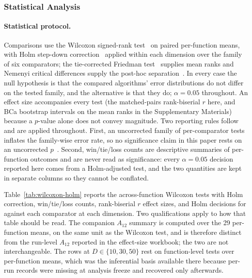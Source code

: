 \subsubsection{Statistical Analysis}\label{sec:exp:stats}

\paragraph{Statistical protocol.}
Comparisons use the Wilcoxon signed-rank test~\cite{wilcoxon1945individual} on
paired per-function means, with Holm step-down
correction~\cite{holm1979simple} applied within each dimension over the family
of six comparators; the tie-corrected Friedman test~\cite{friedman1937use}
supplies mean ranks and Nemenyi critical differences supply the post-hoc
separation~\cite{demsar2006statistical}. In every case the null hypothesis is
that the compared algorithms' error distributions do not differ on the tested
family, and the alternative is that they do; $\alpha = 0.05$ throughout.
An effect size accompanies every test
(the matched-pairs rank-biserial $r$ here, and BCa bootstrap intervals on the
mean ranks in the Supplementary Materials) because a $p$-value alone does not
convey magnitude. Two reporting rules follow and are applied throughout. First,
an uncorrected family of per-comparator tests inflates the family-wise error
rate, so no significance claim in this paper rests on an uncorrected
$p$~\cite{holm1979simple,demsar2006statistical}. Second, win/tie/loss counts are
descriptive summaries of per-function outcomes and are never read as
significance: every $\alpha = 0.05$ decision reported here comes from a
Holm-adjusted test, and the two quantities are kept in separate columns so they
cannot be conflated.

Table~\ref{tab:wilcoxon-holm} reports the across-function Wilcoxon
tests with Holm correction, win/tie/loss counts, rank-biserial $r$ effect
sizes, and Holm decisions for \dtgsk{} against each comparator at
each dimension. Two qualifications apply to how that table should be
read. The companion $A_{12}$ summary is computed over the 29 per-function means,
on the same unit as the Wilcoxon test, and is therefore distinct from
the run-level $A_{12}$ reported in the effect-size workbook; the two
are not interchangeable. The \apgsk{} rows at
$D \in \{10, 30, 50\}$ rest on function-level tests over per-function
means, which was the inferential basis available there because \apgsk{}
per-run records were missing at analysis freeze and recovered only
afterwards.

